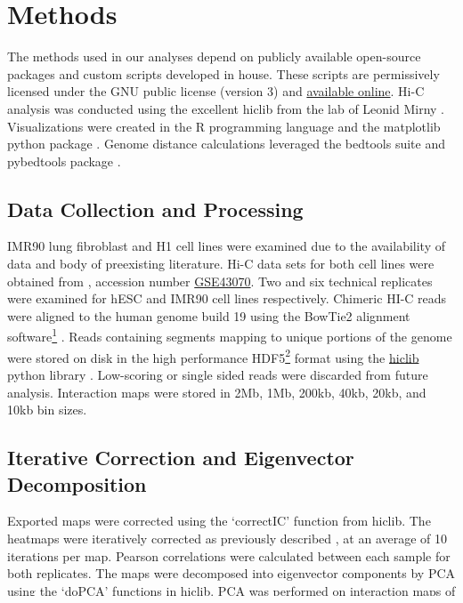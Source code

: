 \chapter{Methods}

The methods used in our analyses depend on publicly available open-source packages and custom scripts developed in house.
These scripts are permissively licensed under the GNU public license (version 3) and
\href{https://github.com/New-College-of-Florida/Jonathan-Niles-Thesis}{available online}.  Hi-C analysis was conducted using
the excellent hiclib from the lab of Leonid Mirny \citep{imakaev2012}.  Visualizations were created in the R programming
language \citep{r2009} and the matplotlib python package \citep{hunter2007}.  Genome distance calculations leveraged the
bedtools suite \citep{quinlan2010} and pybedtools package \citep{dale2011}.

\section*{Data Collection and Processing}

IMR90 lung fibroblast and H1  cell lines were examined due to the availability of data and body of preexisting
literature.  Hi-C data sets for both cell lines were obtained from  \citep{edgar2002}, accession number
\href{http://www.ncbi.nlm.nih.gov/geo/query/acc.cgi?acc=GSE43070}{GSE43070}.  Two and six technical replicates were examined for
\gls{hESC} and IMR90 cell lines respectively.  Chimeric HI-C reads were aligned to the human genome build 19 using the BowTie2
alignment software\footnote{\url{http://bowtie-bio.sourceforge.net/bowtie2/index.shtml}} \citep{langmead2012}. Reads containing
segments mapping to unique portions of the genome were stored on disk in the high performance
HDF5\footnote{\url{http://www.hdfgroup.org/HDF5/}} format using the \href{https://bitbucket.org/mirnylab/hiclib}{hiclib} python
library \citep{imakaev2012}.  Low-scoring or single sided reads were discarded from future analysis.  Interaction maps were
stored in 2Mb, 1Mb, 200kb, 40kb, 20kb, and 10kb bin sizes.

\section*{Iterative Correction and Eigenvector Decomposition}

Exported maps were corrected using the `correctIC' function from hiclib.  The heatmaps were iteratively corrected as previously
described \citep{imakaev2012}, at an average of 10 iterations per map.  Pearson correlations were calculated between each sample
for both replicates.  The maps were decomposed into eigenvector components by \gls{PCA} using the `doPCA' functions in hiclib.
\gls{PCA} was performed on interaction maps of 1Mb and 200kb bin sizes.

